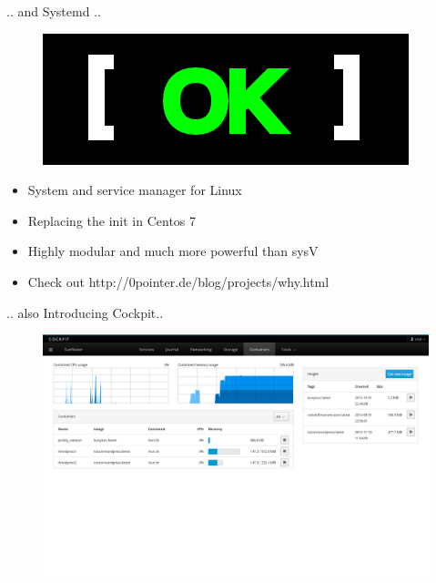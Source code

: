 \documentclass{beamer}
\begin{document}
\begin{frame}{.. and Systemd ..}
\begin{figure}[htp]
\centering
\includegraphics[scale=0.45]{systemd.png}
\label{}
\end{figure}
\begin{itemize}
  \item System and service manager for Linux 
  \item Replacing the init in Centos 7
  \item Highly modular and much more powerful than sysV
  \item Check out http://0pointer.de/blog/projects/why.html
\end{itemize}
\end{frame}

\begin{frame}{.. also Introducing Cockpit..}
\begin{figure}[htp]
\centering
\includegraphics[scale=0.28]{cockpit.png}
\label{}
\end{figure}
\end{frame}
\end{document}
